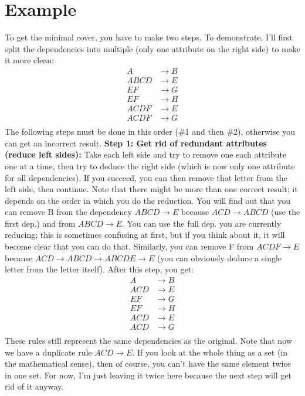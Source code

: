 \documentclass{article}
\begin{document}
\section{Example}
To get the minimal cover, you have to make two steps. To demonstrate, I'll
first split the dependencies into multiple (only one attribute on the right
side) to make it more clean:
\begin{align*}
    A    & \rightarrow B \\
    ABCD & \rightarrow E \\
    EF   & \rightarrow G \\
    EF   & \rightarrow H \\
    ACDF & \rightarrow E \\
    ACDF & \rightarrow G \\
\end{align*}
The following steps must be done in this order (\#1 and then \#2), otherwise
you can get an incorrect result. \textbf{Step 1: Get rid of redundant
    attributes (reduce left sides):} Take each left side and try to remove one each
attribute one at a time, then try to deduce the right side (which is now only
one attribute for all dependencies). If you succeed, you can then remove that
letter from the left side, then continue. Note that there might be more than
one correct result; it depends on the order in which you do the reduction. You
will find out that you can remove B from the dependency $ABCD \rightarrow E$
because $ACD \rightarrow ABCD$ (use the first dep.) and from $ABCD \rightarrow
    E$. You can use the full dep. you are currently reducing; this is sometimes
confusing at first, but if you think about it, it will become clear that you
can do that. Similarly, you can remove F from $ACDF \rightarrow E$ because $ACD
    \rightarrow ABCD \rightarrow ABCDE \rightarrow E$ (you can obviously deduce a
single letter from the letter itself). After this step, you get:
\begin{align*}
    A   & \rightarrow  B \\
    ACD & \rightarrow  E \\
    EF  & \rightarrow  G \\
    EF  & \rightarrow  H \\
    ACD & \rightarrow  E \\
    ACD & \rightarrow  G \\
\end{align*}
These rules still represent the same dependencies as the original. Note that now we have a duplicate rule $ACD \rightarrow E$. If you look at the whole thing as a set (in the mathematical sense), then of course, you can't have the same element twice in one set. For now, I'm just leaving it twice here because the next step will get rid of it anyway.
\end{document}
